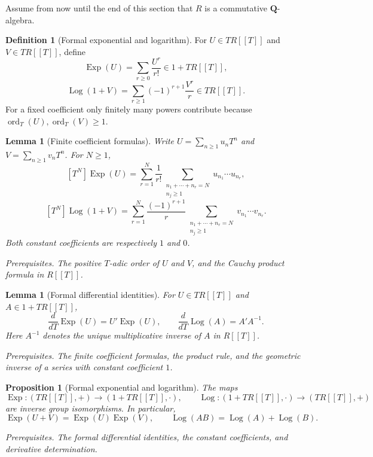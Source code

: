 \documentclass[10pt]{article}
\newtheorem{proposition}[theorem]{Proposition}
\newtheorem{lemma}[theorem]{Lemma}
\theoremstyle{definition}
\newtheorem{definition}[theorem]{Definition}
\newcommand{\ord}{\operatorname{ord}}
\newcommand{\deps}[1]{\par\smallskip\noindent\textit{Prerequisites.} #1}
\begin{document}
Assume from now until the end of this section that \(R\) is a commutative
\(\mathbf Q\)-algebra.

\begin{definition}[Formal exponential and logarithm]
For \(U\in TR[[T]]\) and \(V\in TR[[T]]\), define
\[
 \operatorname{Exp}(U)=\sum_{r\geq0}\frac{U^r}{r!}
 \in1+TR[[T]],
\]
\[
 \operatorname{Log}(1+V)
 =\sum_{r\geq1}(-1)^{r+1}\frac{V^r}{r}
 \in TR[[T]].
\]
For a fixed coefficient only finitely many powers contribute because
\(\ord_T(U),\ord_T(V)\geq1\).
\end{definition}

\begin{lemma}[Finite coefficient formulas]
Write \(U=\sum_{n\geq1}u_nT^n\) and
\(V=\sum_{n\geq1}v_nT^n\).  For \(N\geq1\),
\[
 [T^N]\operatorname{Exp}(U)
 =\sum_{r=1}^{N}\frac1{r!}
   \sum_{\substack{n_1+\cdots+n_r=N\\n_j\geq1}}
   u_{n_1}\cdots u_{n_r},
\]
\[
 [T^N]\operatorname{Log}(1+V)
 =\sum_{r=1}^{N}\frac{(-1)^{r+1}}r
   \sum_{\substack{n_1+\cdots+n_r=N\\n_j\geq1}}
   v_{n_1}\cdots v_{n_r}.
\]
Both constant coefficients are respectively \(1\) and \(0\).
\deps{The positive \(T\)-adic order of \(U\) and \(V\), and the Cauchy
product formula in \(R[[T]]\).}
\end{lemma}

\begin{lemma}[Formal differential identities]
For \(U\in TR[[T]]\) and \(A\in1+TR[[T]]\),
\[
 \frac{d}{dT}\operatorname{Exp}(U)
 =U'\operatorname{Exp}(U),
 \qquad
 \frac{d}{dT}\operatorname{Log}(A)=A'A^{-1}.
\]
Here \(A^{-1}\) denotes the unique multiplicative inverse of \(A\) in
\(R[[T]]\).
\deps{The finite coefficient formulas, the product rule, and the geometric
inverse of a series with constant coefficient \(1\).}
\end{lemma}

\begin{proposition}[Formal exponential and logarithm]
The maps
\[
 \operatorname{Exp}:(TR[[T]],+)\longrightarrow(1+TR[[T]],\cdot),
 \qquad
 \operatorname{Log}:(1+TR[[T]],\cdot)\longrightarrow(TR[[T]],+)
\]
are inverse group isomorphisms.  In particular,
\[
 \operatorname{Exp}(U+V)=\operatorname{Exp}(U)\operatorname{Exp}(V),
 \qquad
 \operatorname{Log}(AB)=\operatorname{Log}(A)+\operatorname{Log}(B).
\]
\deps{The formal differential identities, the constant coefficients, and
derivative determination.}
\end{proposition}
\end{document}
